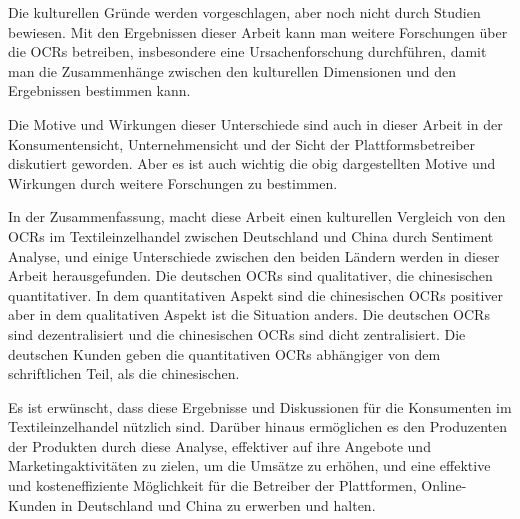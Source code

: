 Die kulturellen Gründe werden vorgeschlagen, aber noch nicht durch Studien bewiesen. Mit den Ergebnissen dieser Arbeit kann man weitere Forschungen über die \acl{OCRs} betreiben, insbesondere eine Ursachenforschung durchführen, damit man die Zusammenhänge zwischen den kulturellen Dimensionen und den Ergebnissen bestimmen kann.

Die Motive und Wirkungen dieser Unterschiede sind auch in dieser Arbeit in der Konsumentensicht, Unternehmensicht und der Sicht der Plattformsbetreiber diskutiert geworden. Aber es ist auch wichtig die obig dargestellten Motive und Wirkungen durch weitere Forschungen zu bestimmen.

In der Zusammenfassung, macht diese Arbeit einen kulturellen Vergleich von den \acl{OCRs} im Textileinzelhandel zwischen Deutschland und China durch Sentiment Analyse, und einige Unterschiede zwischen den beiden Ländern werden in dieser Arbeit herausgefunden. Die deutschen \acl{OCRs} sind qualitativer, die chinesischen quantitativer. In dem quantitativen Aspekt sind die chinesischen \acl{OCRs} positiver aber in dem qualitativen Aspekt ist die Situation anders. Die deutschen \acl{OCRs} sind dezentralisiert und die chinesischen \acl{OCRs} sind dicht zentralisiert. Die deutschen Kunden geben die quantitativen \acl{OCRs} abhängiger von dem schriftlichen Teil, als die chinesischen. 

Es ist erwünscht, dass diese Ergebnisse und Diskussionen für die Konsumenten im Textileinzelhandel nützlich sind. Darüber hinaus ermöglichen es den Produzenten der Produkten durch diese Analyse, effektiver auf ihre Angebote und Marketingaktivitäten zu zielen, um die Umsätze zu erhöhen, und eine effektive und kosteneffiziente Möglichkeit für die Betreiber der Plattformen, Online-Kunden in Deutschland und China zu erwerben und halten.
